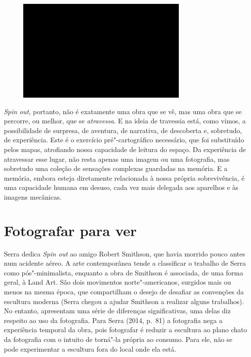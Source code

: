 \begin{figure}[!ht]
\centering
 \includegraphics[width=85mm]{./imgs/im1.jpg}
\caption{\tiny{}}
\end{figure}

\emph{Spin out}, portanto, não é exatamente uma obra que se vê, mas uma
obra que se percorre, ou melhor, que se \emph{atravessa}. E na ideia de
travessia está, como vimos, a possibilidade de surpresa, de aventura, de
narrativa, de descoberta e, sobretudo, de experiência. Este é o
exercício pré"-cartográfico necessário, que foi substituído pelos mapas,
atrofiando nossa capacidade de leitura do espaço. Da experiência de
atravessar esse lugar, não resta apenas uma imagem ou uma fotografia,
mas sobretudo uma coleção de sensações complexas guardadas na memória. E
a memória, embora esteja diretamente relacionada à nossa própria
sobrevivência, é uma capacidade humana em desuso, cada vez mais delegada
aos aparelhos e às imagens mecânicas.

\chapter{Fotografar para ver}

Serra dedica \emph{Spin out} ao amigo Robert Smithson, que havia morrido
pouco antes num acidente aéreo. A arte contemporânea tende a classificar
o trabalho de Serra como pós"-minimalista, enquanto a obra de Smithson é
associada, de uma forma geral, à Land Art. São dois movimentos
norte"-americanos, surgidos mais ou menos na mesma época, que
compartilham o desejo de desafiar as convenções da escultura moderna
(Serra chegou a ajudar Smithson a realizar alguns trabalhos). No
entanto, apresentam uma série de diferenças significativas, uma delas
diz respeito ao uso da fotografia. Para Serra (2014, p.~81) a fotografia
nega a experiência temporal da obra, pois fotografar é reduzir a
escultura ao plano chato da fotografia com o intuito de torná"-la própria
ao consumo. Para ele, não se pode experimentar a escultura fora do local
onde ela está.

